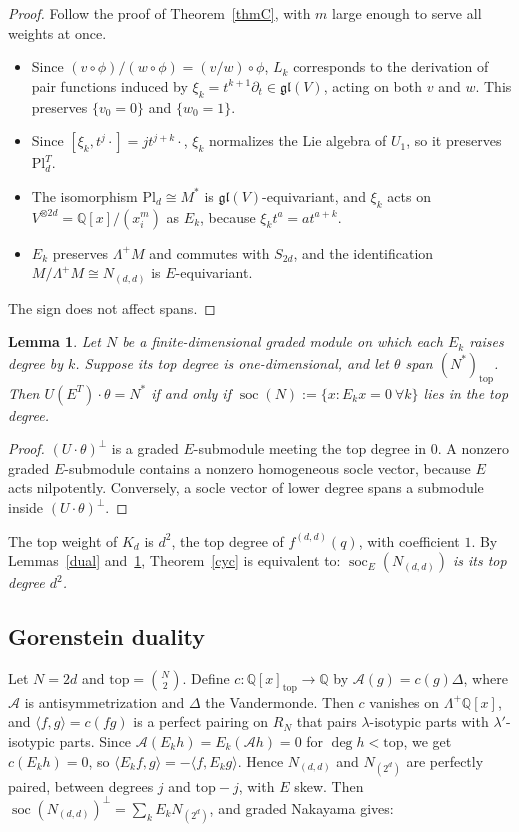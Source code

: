 \documentclass[11pt]{article}
\newtheorem{lemma}[theorem]{Lemma}
\theoremstyle{definition}
\theoremstyle{remark}
\newcommand{\Q}{\mathbb{Q}}
\newcommand{\La}{\Lambda}
\newcommand{\Pl}{\mathrm{Pl}}
\newcommand{\soc}{\operatorname{soc}}
\begin{document}
\begin{proof}
Follow the proof of Theorem~\ref{thmC}, with $m$ large enough to serve all weights at once.
\begin{itemize}
\item Since $(v\circ\phi)/(w\circ\phi)=(v/w)\circ\phi$, $L_k$ corresponds to the derivation of pair functions
induced by $\xi_k=t^{k+1}\partial_t\in\mathfrak{gl}(V)$, acting on both $v$ and $w$. This preserves $\{v_0=0\}$ and
$\{w_0=1\}$.
\item Since $[\xi_k,t^j\cdot]=jt^{j+k}\cdot$, $\xi_k$ normalizes the Lie algebra of $U_1$, so it preserves
$\Pl_d^T$.
\item The isomorphism $\Pl_d\cong M^*$ is $\mathfrak{gl}(V)$-equivariant, and $\xi_k$ acts on
$V^{\otimes2d}=\Q[x]/(x_i^m)$ as $E_k$, because $\xi_kt^a=at^{a+k}$.
\item $E_k$ preserves $\La^+M$ and commutes with $S_{2d}$, and the identification
$M/\La^+M\cong N_{(d,d)}$ is $E$-equivariant.
\end{itemize}
The sign does not affect spans.
\end{proof}

\begin{lemma}\label{socle}
Let $N$ be a finite-dimensional graded module on which each $E_k$ raises degree by $k$. Suppose its top degree is
one-dimensional, and let $\theta$ span $(N^*)_{\mathrm{top}}$. Then $U(E^T)\cdot\theta=N^*$ if and only if
$\soc(N):=\{x:E_kx=0\ \forall k\}$ lies in the top degree.
\end{lemma}

\begin{proof}
$(U\cdot\theta)^\perp$ is a graded $E$-submodule meeting the top degree in $0$. A nonzero graded $E$-submodule
contains a nonzero homogeneous socle vector, because $E$ acts nilpotently. Conversely, a socle vector of lower
degree spans a submodule inside $(U\cdot\theta)^\perp$.
\end{proof}

The top weight of $K_d$ is $d^2$, the top degree of $f^{(d,d)}(q)$, with coefficient $1$. By
Lemmas~\ref{dual} and~\ref{socle}, Theorem~\ref{cyc} is equivalent to: \emph{$\soc_E(N_{(d,d)})$ is its top degree
$d^2$.}

\subsection{Gorenstein duality}

Let $N=2d$ and $\mathrm{top}=\binom{N}{2}$. Define $c\colon\Q[x]_{\mathrm{top}}\to\Q$ by $\mathcal A(g)=c(g)\Delta$,
where $\mathcal A$ is antisymmetrization and $\Delta$ the Vandermonde. Then $c$ vanishes on $\La^+\Q[x]$, and
$\langle f,g\rangle=c(fg)$ is a perfect pairing on $R_N$ that pairs $\lambda$-isotypic parts with
$\lambda'$-isotypic parts. Since $\mathcal A(E_kh)=E_k(\mathcal Ah)=0$ for $\deg h<\mathrm{top}$, we get
$c(E_kh)=0$, so $\langle E_kf,g\rangle=-\langle f,E_kg\rangle$. Hence $N_{(d,d)}$ and $N_{(2^d)}$ are perfectly
paired, between degrees $j$ and $\mathrm{top}-j$, with $E$ skew. Then
$\soc(N_{(d,d)})^\perp=\sum_kE_kN_{(2^d)}$, and graded Nakayama gives:
\end{document}
